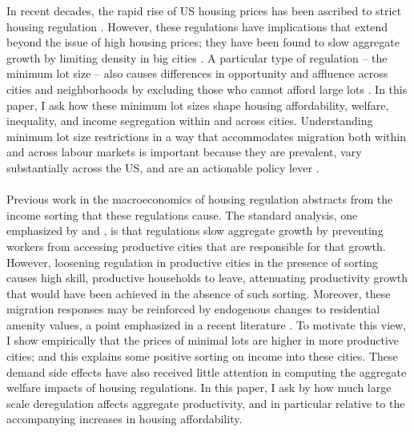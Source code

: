 \documentclass[12pt]{article}
\begin{document}
	In recent decades, the rapid rise of US housing prices has been ascribed to strict housing regulation \citep{molloynathansonpaciorek, superstarcities}. However, these regulations have implications that extend beyond the issue of high housing prices; they have been found to slow aggregate growth by limiting density in big cities \citep{hseihmoretti,durantonpugaurbgrowth}. A particular type of regulation -- the minimum lot size -- also causes differences in opportunity and affluence across cities and neighborhoods by excluding those who cannot afford large lots \citep{Song, kulka}. In this paper, I ask how these minimum lot sizes shape housing affordability, welfare, inequality, and income segregation within and across cities. Understanding minimum lot size restrictions in a way that accommodates migration both within and across labour markets is important because they are prevalent, vary substantially across the US, and are an actionable policy lever \citep{gyourko2021}. 
	
	\paragraph*{}
	Previous work in the macroeconomics of housing regulation abstracts from the income sorting that these regulations cause. The standard analysis, one emphasized by \cite{hseihmoretti} and \cite{durantonpugaurbgrowth}, is that regulations slow aggregate growth by preventing workers from accessing productive cities that are responsible for that growth. However, loosening regulation in productive cities in the presence of sorting causes high skill, productive households to leave, attenuating productivity growth that would have been achieved in the absence of such sorting. Moreover, these migration responses may be reinforced by endogenous changes to residential amenity values, a point emphasized in a recent literature \citep{diamond2016, AlmagroDI}. To motivate this view, I show empirically that the prices of minimal lots are higher in more productive cities; and this explains some positive sorting on income into these cities. These demand side effects have also received little attention in computing the aggregate welfare impacts of housing regulations. In this paper, I ask by how much large scale deregulation affects aggregate productivity, and in particular relative to the accompanying increases in housing affordability. 
	  
	
\end{document}
